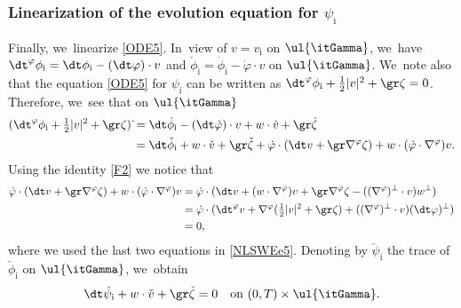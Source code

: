 \subsubsection{Linearization of the evolution equation for $\psi_\mathrm{i}$}
Finally, we~linearize \eqref{ODE5}. In~view of $v=v_\mathrm{i}$ on $\ul{\itGamma}$, we~have $\dt^\varphi\phi_\mathrm{i}=\dt\phi_\mathrm{i}-(\dt\varphi)\cdot v$ and
$\check{\phi}_\mathrm{i}=\dot{\phi}_\mathrm{i}-\dot{\varphi}\cdot v$ on $\ul{\itGamma}$. We~note also that the equation \eqref{ODE5} for $\psi_\mathrm{i}$ can be written as $\dt^\varphi\phi_\mathrm{i}+\tfrac12|v|^2+\gr\zeta=0$.
Therefore, we~see that on $\ul{\itGamma}$
\begin{align*}
(\dt^\varphi\phi_\mathrm{i}+\tfrac12|v|^2+\gr\zeta)\,\dot{}
&= \dt\dot{\phi}_\mathrm{i}-(\dt\dot{\varphi})\cdot v + w\cdot\dot{v}+\gr\dot{\zeta} \\
&= \dt\check{\phi}_\mathrm{i}+w\cdot\check{v}+\gr\check{\zeta} + \dot{\varphi}\cdot(\dt v+\gr\nabla^\varphi\zeta) + w\cdot(\dot{\varphi}\cdot\nabla^\varphi)v.
\end{align*}
Using the identity \eqref{F2} we notice that
\begin{align*}
\dot{\varphi}\cdot(\dt v+\gr\nabla^\varphi\zeta) + w\cdot(\dot{\varphi}\cdot\nabla^\varphi)v
&= \dot{\varphi}\cdot(\dt v+(w\cdot\nabla^\varphi)v+\gr\nabla^\varphi\zeta - ((\nabla^\varphi)^\perp\cdot v)w^\perp) \\
&= \dot{\varphi}\cdot(\dt^\varphi v+\nabla^\varphi(\tfrac12|v|^2+\gr\zeta) + ((\nabla^\varphi)^\perp\cdot v)(\dt\varphi)^\perp) \\
&= 0,
\end{align*}
where we used the last two equations in \eqref{NLSWEe5}.
Denoting by $\check{\psi}_\mathrm{i}$ the trace of $\check{\phi}_\mathrm{i}$ on $\ul{\itGamma}$, we~obtain
\begin{equation}\label{LODE1}
\dt\check{\psi}_\mathrm{i}+w\cdot\check{v}+\gr\check{\zeta}=0 \quad\text{on } (0,T)\times\ul{\itGamma}.
\end{equation}

